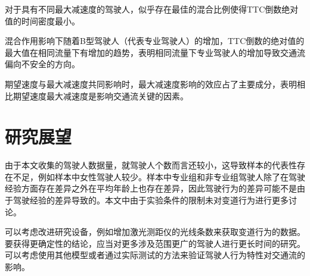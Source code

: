 对于具有不同最大减速度的驾驶人，似乎存在最佳的混合比例使得TTC倒数绝对值的时间密度最小。

混合作用影响下随着B型驾驶人（代表专业驾驶人）的增加，TTC倒数的绝对值的最大值在相同流量下有增加的趋势，表明相同流量下专业驾驶人的增加导致交通流偏向不安全的方向。

期望速度与最大减速度共同影响时，最大减速度影响的效应占了主要成分，表明相比期望速度最大减速度是影响交通流关键的因素。


\section{研究展望}

由于本文收集的驾驶人数据量，就驾驶人个数而言还较小，这导致样本的代表性存在不足，例如样本中女性驾驶人较少。样本中专业组和非专业组驾驶人除了在驾驶经验方面存在差异之外在平均年龄上也存在差异，因此驾驶行为的差异可能不是由于驾驶经验的差异导致的。本文中由于实验条件的限制未对变道行为进行更多讨论。


可以考虑改进研究设备，例如增加激光测距仪的光线条数来获取变道行为的数据。要获得更确定性的结论，应当对更多涉及范围更广的驾驶人进行更长时间的研究。可以考虑使用其他模型或者通过实际测试的方法来验证驾驶人行为特性对交通流的影响。



